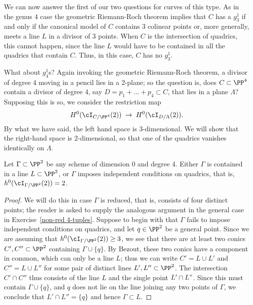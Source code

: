 We can now answer the first of our two questions for curves of this type. As in the genus 4 case the geometric Riemann-Roch theorem implies that $C$ has a $g^1_3$ if and only if the canonical model of $C$ contains 3 colinear points or, more generally, meets a line $L$ in a divisor of 3 points. When $C$ is the intersection of quadrics, this cannot happen, since the line $L$ would have to be contained in all the quadrics that contain $C$. Thus, in this case, 
$C$ has no $g^1_3$.

What about $g^1_4$s? Again invoking the geometric Riemann-Roch theorem, a divisor of degree 4 moving in a pencil lies in a 2-plane; so the question is, does $C \subset \PP^4$ contain a divisor of degree 4, say $D = p_1+\dots +p_4 \subset C$, that lies in a plane $\Lambda$? Supposing this is so, we consider the restriction map
$$
H^0(\cI_{C/\PP^4}(2)) \; \to \; H^0(\cI_{D/\Lambda}(2)).
$$
By what we have said, the left hand space is 3-dimensional. We will show that the right-hand space
is 2-dimensional, so that one of the quadrics vanishes identically on $\Lambda$.

\begin{lemma}\label{4-tuples}
Let $\Gamma \subset \PP^2$ be any scheme of dimension 0 and degree 4. Either $\Gamma$ is contained in a line $L \subset \PP^2$, or $\Gamma$ imposes independent conditions on quadrics, that is, $h^0(\cI_{\Gamma /\PP^2}(2)) = 2$.
\end{lemma}

\begin{proof}
We will do this in case $\Gamma$ is reduced, that is, consists of four distinct points; the reader is asked to supply the analogous argument in the general case in Exercise~\ref{non-red 4-tuples}. Suppose to begin with that $\Gamma$ fails to impose independent conditions on quadrics, and let $q \in \PP^2$ be a general point. Since we are assuming that $h^0(\cI_{\Gamma /\PP^2}(2)) \geq 3$, we see that there are at least two conics $C', C'' \subset \PP^2$ containing $\Gamma \cup \{q\}$. By Bezout, these two conics have a component in common, which can only be a line $L$; thus we can write $C' = L \cup L'$ and $C'' = L \cup L''$ for some pair of distinct lines $L', L'' \subset \PP^2$. The intersection $C' \cap C''$ thus consists of the line $L$ and the single point $L' \cap L"$. Since this must contain $\Gamma \cup \{q\}$, and $q$ does not lie on the line joining any two points of $\Gamma$, we conclude that $L' \cap L'' = \{q\}$ and hence $\Gamma \subset L$.
\end{proof}

